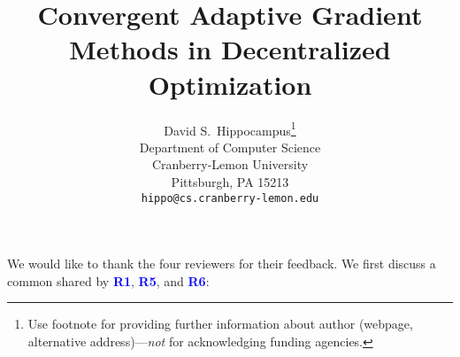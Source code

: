 \documentclass{article} %
\title{Convergent Adaptive Gradient Methods in Decentralized Optimization\vspace{-0.15in}}
\begin{document}
\maketitle


\author{%
  David S.~Hippocampus\thanks{Use footnote for providing further information
    about author (webpage, alternative address)---\emph{not} for acknowledging
    funding agencies.} \\
  Department of Computer Science\\
  Cranberry-Lemon University\\
  Pittsburgh, PA 15213 \\
  \texttt{hippo@cs.cranberry-lemon.edu} \\
}



We would like to thank the four reviewers for their feedback. 
We first discuss a common shared by \textcolor{blue}{\textbf{R1}},  \textcolor{blue}{\textbf{R5}}, and  \textcolor{blue}{\textbf{R6}}:
\vspace{-2pt}
\end{document}
